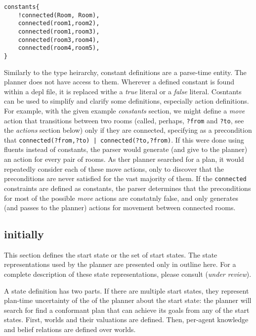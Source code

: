 \documentclass{article}
\begin{document}
\begin{verbatim}
constants{
    !connected(Room, Room),
    connected(room1,room2),
    connected(room1,room3),
    connected(room3,room4),
    connected(room4,room5),
}
\end{verbatim}

Similarly to the type heirarchy, constant definitions are a parse-time entity.
The planner does not have access to them.
Wherever a defined constant is found within a depl file, it is replaced withe a
\emph{true} literal or a
\emph{false} literal.  Cosntants can be used to simplify and clarify some definitions,
especially action definitions. For example, with the given example
\emph{constants} section, we might define a \emph{move} action that transitions
between two rooms (called, perhaps, \verb|?from| and \verb|?to|, see the
\emph{actions} section below) only if they are connected, specifying as a
precondition that \verb"connected(?from,?to) | connected(?to,?from)".  If this
were done using fluents instead of constants,
the parser would generate (and give to the planner) an
action for every pair of rooms. As ther planner searched for a plan, it
would repeatedly consider each of these move actions, only to discover that the
preconditions are never satisfied for the vast majority of them. If
the \verb|connected| constraints are defined as constants, the parser determines that
the preconditions for most of the possible \emph{move} actions are constatnly
false, and only generates (and passes to the planner) actions for movement
between connected rooms.



\subsection{initially}

This section defines the start state or the set of start states.
The state representations used by the planner are presented only in outline
here. For a complete description of these state representations, please
consult  (\emph{under review}). 

A state definition has two parts.
If there are multiple start states, they represent
plan-time uncertainty of the of the planner about the start state: the planner
will search for find a conformant plan that can achieve its goals from any of
the start states.
First, worlds and their valuations are
defined. Then, per-agent knowledge and belief relations are defined over worlds.
\end{document}
